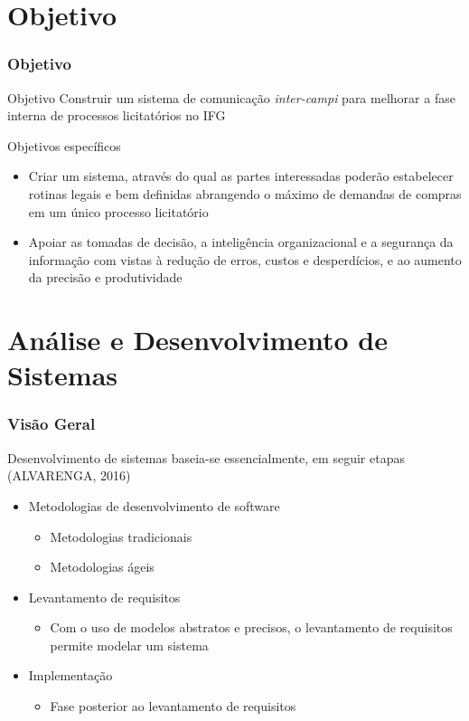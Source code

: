 \documentclass{beamer}
\begin{document}
	\section{Objetivo}
	\begin{frame}\frametitle{Objetivo}
	\begin{block}{Objetivo}
		Construir um sistema de comunicação \textit{inter-campi} para melhorar a fase interna de
		processos licitatórios no IFG
	\end{block}
	\begin{block}{Objetivos específicos}

	\begin{itemize}
		\item Criar um sistema, através do qual as partes interessadas poderão estabelecer rotinas
		legais e bem definidas abrangendo o máximo de demandas de compras em um único
		processo licitatório
		\item Apoiar as tomadas de decisão, a inteligência organizacional e a segurança da informação
		com vistas à redução de erros, custos e desperdícios, e ao aumento da
		precisão e produtividade
	\end{itemize}
	\end{block}	
	\end{frame}

	\section{Análise e Desenvolvimento de Sistemas}
	
	\begin{frame}\frametitle{Visão Geral}
		Desenvolvimento de sistemas baseia-se essencialmente, em seguir etapas (ALVARENGA, 2016)
		
		\begin{itemize}
			\item Metodologias de desenvolvimento de software
			\begin{itemize}
				\item Metodologias tradicionais
				\item Metodologias ágeis
			\end{itemize}
			\item Levantamento de requisitos
			\begin{itemize}
				\item Com o uso de modelos abstratos e precisos, o levantamento de requisitos permite modelar um sistema
			\end{itemize}
			\item Implementação
			\begin{itemize}
				\item Fase posterior ao levantamento de requisitos
			\end{itemize}	
		\end{itemize}
	\end{frame}
\end{document}
